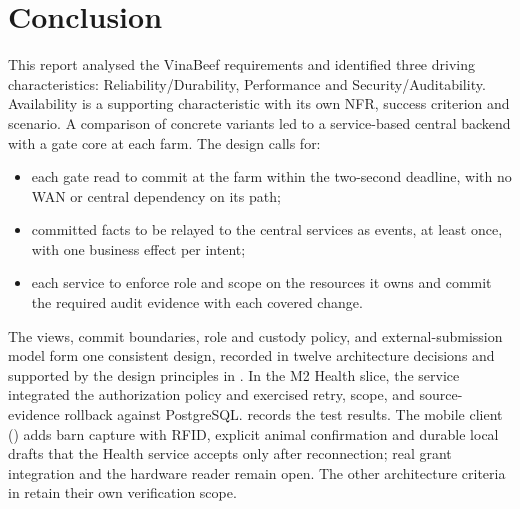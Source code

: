 \section{Conclusion}\label{sec:8}

This report analysed the VinaBeef requirements and identified three
driving characteristics: Reliability/Durability, Performance and
Security/Auditability. Availability is a supporting characteristic with
its own NFR, success criterion and scenario. A comparison of concrete
variants led to a service-based central backend with a gate core at
each farm. The design calls for:

\begin{itemize}
\item
  each gate read to commit at the farm within the two-second deadline,
  with no WAN or central dependency on its path;
\item
  committed facts to be relayed to the central services as events, at
  least once, with one business effect per intent;
\item
  each service to enforce role and scope on the resources it owns and
  commit the required audit evidence with each covered change.
\end{itemize}

The views, commit boundaries, role and custody policy, and
external-submission model form one consistent design, recorded in twelve
architecture decisions and supported by the design principles in
. In the M2 Health slice, the service integrated the
authorization policy and exercised retry, scope, and
source-evidence rollback against PostgreSQL.
 records the test results. The mobile
client () adds barn capture with RFID, explicit
animal confirmation and durable local drafts that the Health service
accepts only after reconnection; real grant integration and the
hardware reader remain open. The other architecture
criteria in  retain their own verification scope.
